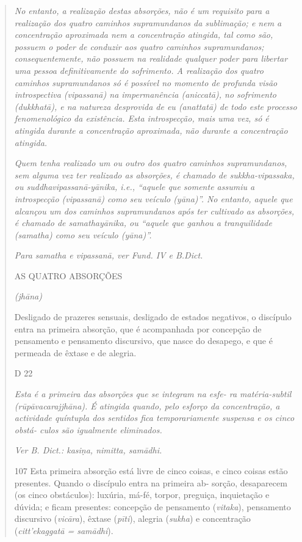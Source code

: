\begin{quote}
\emph{No entanto, a realização destas absorções, não é um requisito para a realização dos quatro caminhos supramundanos da sublimação; e nem a concentração aproximada nem a concentração atingida, tal como são, possuem o poder de conduzir aos quatro caminhos supramundanos; consequentemente, não possuem na realidade qualquer poder para libertar uma pessoa definitivamente do sofrimento. A realização dos quatro caminhos supramundanos só é possível no momento de profunda visão introspectiva (vipassanā) na impermanência (aniccatā), no sofrimento (dukkhatā), e na natureza desprovida de eu (anattatā) de todo este processo fenomenológico da existência. Esta introspecção, mais uma vez, só é atingida durante a concentração aproximada, não durante a concentração atingida.}

\emph{Quem tenha realizado um ou outro dos quatro caminhos supramundanos, sem alguma vez ter realizado as absorções, é chamado de sukkha-vipassaka, ou suddhavipassanā-yānika, i.e., ``aquele que somente assumiu a introspecção (vipassanā) como seu veículo (yāna)''. No entanto, aquele que alcançou um dos caminhos supramundanos após ter cultivado as absorções, é chamado de samathayānika, ou ``aquele que ganhou a tranquilidade (samatha) como seu veículo (yāna)''.}

\emph{Para samatha e vipassanā, ver Fund. IV e B.Dict.}

AS QUATRO ABSORÇÕES

\emph{(jhāna)}

Desligado de prazeres sensuais, desligado de estados negativos, o discípulo entra na primeira absorção, que é acompanhada por concepção de pensamento e pensamento discursivo, que nasce do desapego, e que é permeada de êxtase e de alegria.

D 22

\emph{Esta é a primeira das absorções que se integram na esfe- ra matéria-subtil (rūpāvacarajjhāna). É atingida quando, pelo esforço da concentração, a actividade quíntupla dos sentidos fica temporariamente suspensa e os cinco obstá- culos são igualmente eliminados.}

\emph{Ver B. Dict.: kasiṇa, nimitta, samādhi.}

107 Esta primeira absorção está livre de cinco coisas, e cinco coisas estão presentes. Quando o discípulo entra na primeira ab- sorção, desaparecem (os cinco obstáculos): luxúria, má-fé, torpor, preguiça, inquietação e dúvida; e ficam presentes: concepção de pensamento (\emph{vitaka}), pensamento discursivo (\emph{vicāra}), êxtase (\emph{pīti}), alegria (\emph{sukha}) e concentração (\emph{citt'ekaggatā = samādhi}).


\end{quote}
